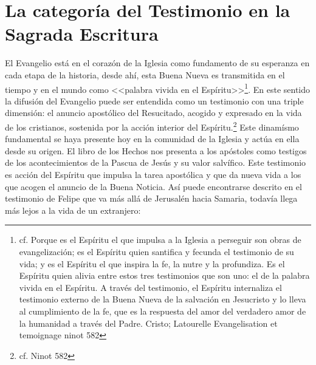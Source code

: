 \section{La categoría del Testimonio en la Sagrada Escritura}
El Evangelio está en el corazón de la Iglesia como fundamento de su esperanza en
cada etapa de la historia, desde ahí, esta Buena Nueva es transmitida en el
tiempo y en el mundo como <<palabra vivida en el Espíritu>>\footnote{cf. Porque
  es el Espíritu el que impulsa a la Iglesia a perseguir son obras de
  evangelización; es el Espíritu quien santifica y fecunda el testimonio de su
  vida; y es el Espíritu el que inspira la fe, la nutre y la profundiza. Es el
  Espíritu quien alivia entre estos tres testimonios que son uno: el de la
  palabra vivida en el Espíritu. A través del testimonio, el Espíritu
  internaliza el testimonio externo de la Buena Nueva de la salvación en
  Jesucristo y lo lleva al cumplimiento de la fe, que es la respuesta del amor
  del verdadero amor de la humanidad a través del Padre. Cristo; Latourelle
  Evangelisation et temoignage ninot 582}. En este sentido la difusión del
Evangelio puede ser entendida como un testimonio con una triple dimensión: el
anuncio apostólico del Resucitado, acogido y expresado en la vida de los
cristianos, sostenida por la acción interior del Espíritu.\footnote{cf. Ninot
  582} Este dinamísmo fundamental se haya presente hoy en la comunidad de la
Iglesia y actúa en ella desde su origen. El libro de los Hechos nos presenta a
los apóstoles como testigos de los acontecimientos de la Pascua de Jesús y su
valor salvífico. Este testimonio es acción del Espíritu que impulsa la tarea
apostólica y que da nueva vida a los que acogen el anuncio de la Buena Noticia.
Así puede encontrarse descrito en el testimonio de Felipe que va más allá de
Jerusalén hacia Samaria, todavía llega más lejos a la vida de un extranjero:


